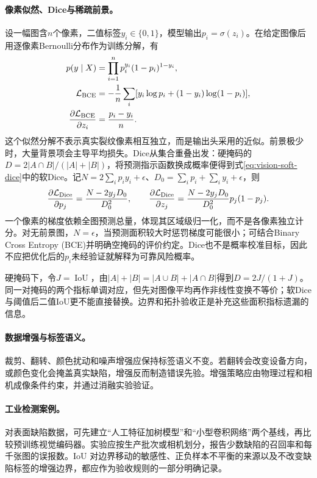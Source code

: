 \paragraph{像素似然、Dice与稀疏前景。}
设一幅图含$n$个像素，二值标签$y_i\in\{0,1\}$，模型输出$p_i=\sigma(z_i)$。在给定图像后用逐像素Bernoulli分布作为训练分解，有
\begin{align}
 p(y\mid X)&=\prod_{i=1}^n p_i^{y_i}(1-p_i)^{1-y_i},\\
 \mathcal L_{\rm BCE}&=-\frac1n\sum_i[y_i\log p_i+(1-y_i)\log(1-p_i)],\\
 \frac{\partial\mathcal L_{\rm BCE}}{\partial z_i}&=\frac{p_i-y_i}{n}.
\end{align}
这个似然分解不表示真实裂纹像素相互独立，而是输出头采用的近似。前景极少时，大量背景项会主导平均损失。Dice从集合重叠出发：硬掩码的$D=2|A\cap B|/(|A|+|B|)$，将预测指示函数换成概率便得到式\eqref{eq:vision-soft-dice}中的软Dice。记$N=2\sum_i p_iy_i+\epsilon$、$D_0=\sum_i p_i+\sum_i y_i+\epsilon$，则
\begin{equation}
 \frac{\partial\mathcal L_{\rm Dice}}{\partial p_j}
 =\frac{N-2y_jD_0}{D_0^2},\qquad
 \frac{\partial\mathcal L_{\rm Dice}}{\partial z_j}
 =\frac{N-2y_jD_0}{D_0^2}p_j(1-p_j).
\end{equation}
一个像素的梯度依赖全图预测总量，体现其区域级归一化，而不是各像素独立计分。对无前景图，$N=\epsilon$，当预测面积较大时惩罚梯度可能很小；可结合Binary Cross Entropy (BCE)并明确空掩码的评价约定。Dice也不是概率校准目标，因此不应把优化后的$p_i$未经验证就解释为可靠风险概率。

硬掩码下，令$J=\operatorname{IoU}$，由$|A|+|B|=|A\cup B|+|A\cap B|$得到$D=2J/(1+J)$。同一对掩码的两个指标单调对应，但先对图像平均再作非线性变换不等价；软Dice与阈值后二值IoU更不能直接替换。边界和拓扑验收正是补充这些面积指标遗漏的信息。

\paragraph{数据增强与标签语义。}
裁剪、翻转、颜色扰动和噪声增强应保持标签语义不变。若翻转会改变设备方向，或颜色变化会掩盖真实缺陷，增强反而制造错误先验。增强策略应由物理过程和相机成像条件约束，并通过消融实验验证。

\paragraph{工业检测案例。}
对表面缺陷数据，可先建立“人工特征加树模型”和“小型卷积网络”两个基线，再比较预训练视觉编码器。实验应按生产批次或相机划分，报告少数缺陷的召回率和每千张图的误报数。IoU 对边界移动的敏感性、正负样本不平衡的来源以及不改变缺陷标签的增强边界，都应作为验收规则的一部分明确记录。

